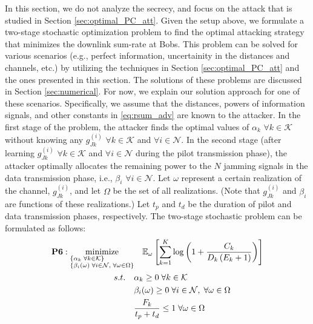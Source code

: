 \documentclass[draftclsnofoot, 12pt, onecolumn, journal]{IEEEtran}
\begin{document}
In this section, we do not analyze the secrecy, and focus on the attack that is studied in Section \ref{sec:optimal_PC_att}.
Given the setup above, we formulate a two-stage stochastic optimization problem to find the optimal attacking strategy that minimizes the downlink sum-rate at Bobs.
This problem can be solved for various scenarios (e.g., perfect information, uncertainity in the distances and channels, etc.) by utilizing the techniques in Section \ref{sec:optimal_PC_att} and the ones presented in this section.
The solutions of these problems are discussed in Section \ref{sec:numerical}.
For now, we explain our solution approach for one of these scenarios.
Specifically, we assume that the distances, powers of information signals, and other constants in \eqref{eq:rsum_adv} are known to the attacker.
In the first stage of the problem, the attacker finds the optimal values of $\alpha_k$ $\forall k \in \mathcal{K}$ without knowing any $g_{Jk}^{(i)}$ $\forall k \in \mathcal{K}$ and $\forall i \in \mathcal{N}$.
In the second stage (after learning $g_{Jk}^{(i)}$ $\forall k \in \mathcal{K}$ and $\forall i \in \mathcal{N}$ during the pilot transmission phase), the attacker optimally allocates the remaining power to the $N$ jamming signals in the data transmission phase, i.e., $\beta_i$ $\forall i \in \mathcal{N}$.
Let $\omega$ represent a certain realization of the channel, $g_{Jk}^{(i)}$, and let $\Omega$ be the set of all realizations.
(Note that $g_{Jk}^{(i)}$ and $\beta_i$ are functions of these realizations.)
Let $t_p$ and $t_d$ be the duration of pilot and data transmission phases, respectively.
The two-stage stochastic problem can be formulated as follows:
%
\begin{align*}
\textbf{P6}:
\underset{ 
\begin{subarray} \\ 
\{ \alpha_k  \; \forall k \in \mathcal{K} \} \\
\{ \beta_i(\omega) \; \forall i \in \mathcal{N}, \; \forall \omega \in \Omega \} \end{subarray} }
{\text{minimize}} 
& \quad \mathbb{E}_{\omega} \left[ \sum_{k=1}^K \log \left( 1 + \dfrac{ C_k }{ D_k  \left(  E_{k}  + 1 \right)}  \right) \right]  \\
 s.t. \quad & \alpha_k \geq 0  \; \forall k \in \mathcal{K} \\
& \beta_i(\omega) \geq 0  \; \forall i \in \mathcal{N}, \;  \forall \omega \in \Omega \\
&  \frac{F_k}{t_p +  t_d}\leq 1 \;  \forall \omega \in \Omega
\end{align*}
\end{document}
